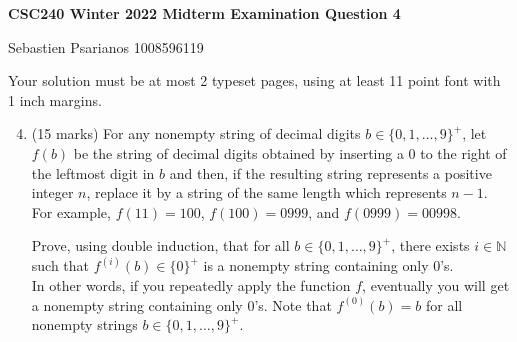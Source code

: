 \documentclass[11pt]{article}
\def\nats{{\mathbb N}}
\begin{document}
\begin{center}
{\bf \Large \bf CSC240 Winter 2022 Midterm Examination Question 4}\\
\begin{solution}
Sebastien Psarianos 1008596119
\end{solution}
\end{center}

\begin{question}
Your solution must be at most 2 typeset pages, using at least 11 point font with 1 inch margins.
\end{question}


\begin{enumerate}
\setcounter{enumi}{3}
\item
\begin{question}
(15 marks)
For any nonempty string of decimal digits $b \in \{0,1, \ldots, 9\}^+$,
let $f(b)$ be the string of decimal digits obtained by
inserting a 0 to the right of the leftmost digit in $b$ and then, if the resulting string represents a positive integer $n$,
replace it by a string of the same length which represents $n-1$.
For example, $f(11) = 100$, $f(100)  = 0999$, and $f(0999) = 00998$.

Prove, using double induction, that for all $b \in \{0,1,\ldots, 9\}^+$,  there exists $i \in \nats$ such that $f^{(i)}(b) \in \{0\}^+$ is a nonempty string containing only 0's.\\
In other words, if you repeatedly apply the function $f$, eventually you will get a nonempty string containing only 0's.
Note that $f^{(0)}(b) = b$ for all nonempty strings $b \in \{0,1,\ldots, 9\}^+$.
\end{question}


\end{enumerate}
\end{document}
